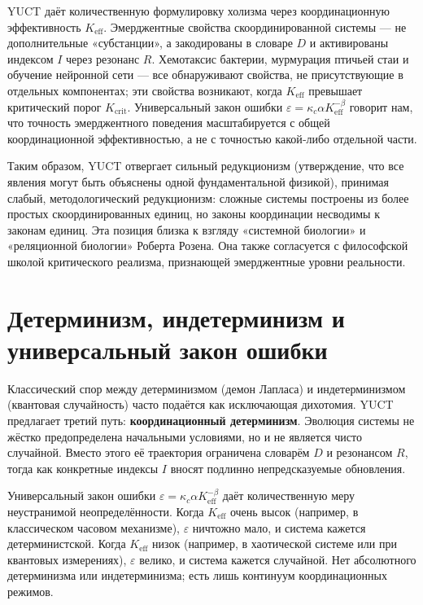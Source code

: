\documentclass[12pt,a4paper]{article}
\begin{document}
	YUCT даёт количественную формулировку холизма через координационную эффективность \(K_{\mathrm{eff}}\). Эмерджентные свойства скоординированной системы — не дополнительные «субстанции», а закодированы в словаре \(D\) и активированы индексом \(I\) через резонанс \(R\). Хемотаксис бактерии, мурмурация птичьей стаи и обучение нейронной сети — все обнаруживают свойства, не присутствующие в отдельных компонентах; эти свойства возникают, когда \(K_{\mathrm{eff}}\) превышает критический порог \(K_{\mathrm{crit}}\). Универсальный закон ошибки \(\varepsilon = \kappa_c \alpha K_{\mathrm{eff}}^{-\beta}\) говорит нам, что точность эмерджентного поведения масштабируется с общей координационной эффективностью, а не с точностью какой‑либо отдельной части.
	
	Таким образом, YUCT отвергает сильный редукционизм (утверждение, что все явления могут быть объяснены одной фундаментальной физикой), принимая слабый, методологический редукционизм: сложные системы построены из более простых скоординированных единиц, но законы координации несводимы к законам единиц. Эта позиция близка к взгляду «системной биологии» и «реляционной биологии» Роберта Розена. Она также согласуется с философской школой критического реализма, признающей эмерджентные уровни реальности.
	
	\section{Детерминизм, индетерминизм и универсальный закон ошибки}
	
	Классический спор между детерминизмом (демон Лапласа) и индетерминизмом (квантовая случайность) часто подаётся как исключающая дихотомия. YUCT предлагает третий путь: \textbf{координационный детерминизм}. Эволюция системы не жёстко предопределена начальными условиями, но и не является чисто случайной. Вместо этого её траектория ограничена словарём \(D\) и резонансом \(R\), тогда как конкретные индексы \(I\) вносят подлинно непредсказуемые обновления.
	
	Универсальный закон ошибки \(\varepsilon = \kappa_c \alpha K_{\mathrm{eff}}^{-\beta}\) даёт количественную меру неустранимой неопределённости. Когда \(K_{\mathrm{eff}}\) очень высок (например, в классическом часовом механизме), \(\varepsilon\) ничтожно мало, и система кажется детерминистской. Когда \(K_{\mathrm{eff}}\) низок (например, в хаотической системе или при квантовых измерениях), \(\varepsilon\) велико, и система кажется случайной. Нет абсолютного детерминизма или индетерминизма; есть лишь континуум координационных режимов.
	
\end{document}
